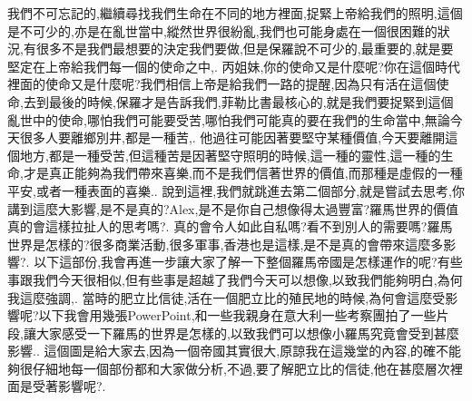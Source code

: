 \documentclass{book}
\begin{document}
我們不可忘記的,繼續尋找我們生命在不同的地方裡面,捉緊上帝給我們的照明,這個是不可少的,亦是在亂世當中,縱然世界很紛亂,我們也可能身處在一個很困難的狀況,有很多不是我們最想要的決定我們要做,但是保羅說不可少的,最重要的,就是要堅定在上帝給我們每一個的使命之中,.
丙姐妹,你的使命又是什麼呢?你在這個時代裡面的使命又是什麼呢?我們相信上帝是給我們一路的提醒,因為只有活在這個使命,去到最後的時候,保羅才是告訴我們,菲勒比書最核心的,就是我們要捉緊到這個亂世中的使命,哪怕我們可能要受苦,哪怕我們可能真的要在我們的生命當中,無論今天很多人要離鄉別井,都是一種苦,.
他過往可能因著要堅守某種價值,今天要離開這個地方,都是一種受苦,但這種苦是因著堅守照明的時候,這一種的靈性,這一種的生命,才是真正能夠為我們帶來喜樂,而不是我們信著世界的價值,而那種是虛假的一種平安,或者一種表面的喜樂..
說到這裡,我們就跳進去第二個部分,就是嘗試去思考,你講到這麼大影響,是不是真的?Alex,是不是你自己想像得太過豐富?羅馬世界的價值真的會這樣拉扯人的思考嗎?.
真的會令人如此自私嗎?看不到別人的需要嗎?羅馬世界是怎樣的?很多商業活動,很多軍事,香港也是這樣,是不是真的會帶來這麼多影響?.
以下這部份,我會再進一步讓大家了解一下整個羅馬帝國是怎樣運作的呢?有些事跟我們今天很相似,但有些事是超越了我們今天可以想像,以致我們能夠明白,為何我這麼強調,.
當時的肥立比信徒,活在一個肥立比的殖民地的時候,為何會這麼受影響呢?以下我會用幾張PowerPoint,和一些我親身在意大利一些考察團拍了一些片段,讓大家感受一下羅馬的世界是怎樣的,以致我們可以想像小羅馬究竟會受到甚麼影響..
這個圖是給大家去,因為一個帝國其實很大,原諒我在這幾堂的內容,的確不能夠很仔細地每一個部份都和大家做分析,不過,要了解肥立比的信徒,他在甚麼層次裡面是受著影響呢?.
\end{document}
